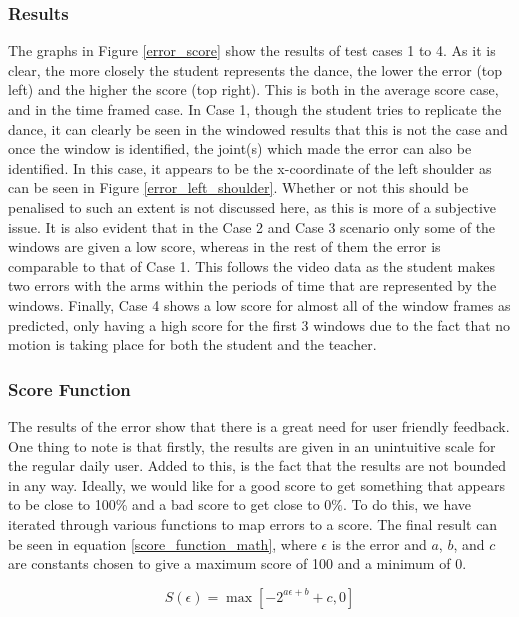 \documentclass[11pt,a4paper]{article}
\begin{document}
\subsubsection{Results}
\noindent
The graphs in Figure \ref{error_score} show the results of test cases 1 to 4. As it is clear, the more closely the student represents the dance, the lower the error (top left) and the higher the score (top right). This is both in the average score case, and in the time framed case. In Case 1, though the student tries to replicate the dance, it can clearly be seen in the windowed results that this is not the case and once the window is identified, the joint(s) which made the error can also be identified. In this case, it appears to be the x-coordinate of the left shoulder as can be seen in Figure \ref{error_left_shoulder}. Whether or not this should be penalised to such an extent is not discussed here, as this is more of a subjective issue. It is also evident that in the Case 2 and Case 3 scenario only some of the windows are given a low score, whereas in the rest of them the error is comparable to that of Case 1. This follows the video data as the student makes two errors with the arms within the periods of time that are represented by the windows. Finally, Case 4 shows a low score for almost all of the window frames as predicted, only having a high score for the first 3 windows due to the fact that no motion is taking place for both the student and the teacher. 

\subsubsection{Score Function}
\noindent
The results of the error show that there is a great need for user friendly feedback. One thing to note is that firstly, the results are given in an unintuitive scale for the regular daily user. Added to this, is the fact that the results are not bounded in any way. Ideally, we would like for a good score to get something that appears to be close to 100\% and a bad score to get close to 0\%. To do this, we have iterated through various functions to map errors to a score. The final result can be seen in equation \eqref{score_function_math}, where $\epsilon$ is the error and $a$, $b$, and $c$ are constants chosen to give a maximum score of 100 and a minimum of 0.

 
\begin{equation}
S(\epsilon) = \max\left[ -2^{a\epsilon + b}+c, 0 \right]
\label{score_function_math}
\end{equation}
\end{document}
